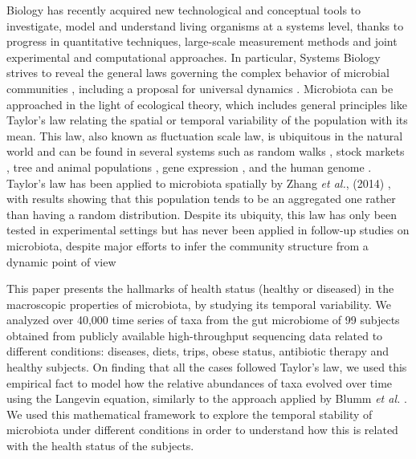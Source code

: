 Biology has recently acquired new technological and conceptual tools to investigate, model and understand living organisms at a systems level, thanks to progress in quantitative techniques, large-scale measurement methods and joint experimental and computational approaches. In particular, Systems Biology strives to reveal the general laws governing the complex behavior of microbial communities \cite{sysbio&microb, msys1, metasysbio}, including a proposal for universal dynamics \cite{uni_dynam}. Microbiota can be approached in the light of ecological theory, which includes general principles like Taylor’s law \cite{pretaylor,taylor} relating the spatial or temporal variability of the population with its mean. This law, also known as fluctuation scale law, is ubiquitous in the natural world and can be found in several systems such as random walks \cite{randomwalks}, stock markets \cite{economics1, economics2}, tree \cite{cohen_taylor} and animal populations \cite{taylor, animal1, animal2}, gene expression \cite{genexpress}, and the human genome \cite{genome}. Taylor's law has been applied to microbiota spatially by Zhang {\it et al.}, (2014) \cite{isme1}, with results showing that this population tends to be an aggregated one rather than having a random distribution. Despite its ubiquity, this law has only been tested in experimental settings \cite{cohen_bac, ramslayer} but has never been applied in follow-up studies on microbiota, despite major efforts to infer the community structure from a dynamic point of view \cite{cobas, schloss, ravel}  

This paper presents the hallmarks of health status (healthy or diseased) in the macroscopic properties of microbiota, by studying its temporal variability. We analyzed over 40,000 time series of taxa from the gut microbiome of 99 subjects obtained from publicly available high-throughput sequencing data related to different conditions: diseases, diets, trips, obese status, antibiotic therapy and healthy subjects. On finding that all the cases followed Taylor’s law, we used this empirical fact to model how the relative abundances of taxa evolved over time using the Langevin equation, similarly to the approach applied by Blumm {\it et al.} \cite{ranking}. We used this mathematical framework to explore the temporal stability of microbiota under different conditions in order to understand how this is related with the health status of the subjects.